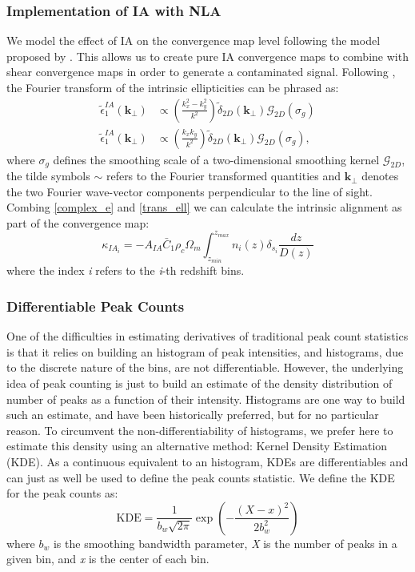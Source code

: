 \documentclass[twocolumn,twocolappendix]{aastex63}
\begin{document}
\subsubsection{Implementation of IA with NLA }
We model the effect of IA on the convergence map level following the model proposed by  \citet{fluri2019cosmological}. This allows us to create pure IA convergence maps to combine with shear convergence maps in order to generate a contaminated signal. 
Following \cite{harnois2021cosmic}, the Fourier transform of the intrinsic ellipticities can be phrased as: 
\begin{align}\label{trans_ell}
    \tilde{ \epsilon}_{1}^{IA}(\textbf{k}_{\bot}) & \propto
    \left ( \frac{k_x^2-k_y^2}{k^2} \right )  \tilde{\delta}_{2D}(\textbf{k}_{\bot})
   \mathcal{G}_{2D}(\sigma_g) \\
       \tilde{ \epsilon}_{1}^{IA}(\textbf{k}_{\bot}) & \propto
    \left ( \frac{k_x k_y}{k^2} \right )  \tilde{\delta}_{2D}(\textbf{k}_{\bot})
   \mathcal{G}_{2D}(\sigma_g), \nonumber
\end{align}
where $\sigma_g$ defines the smoothing scale of a two-dimensional smoothing kernel $\mathcal{G}_{2D}$, the tilde symbols $\sim $ refers to the Fourier transformed quantities and $\textbf{k}_{\bot}$ denotes the two Fourier wave-vector components perpendicular to the line of sight.
Combing \autoref{complex_e} and \autoref{trans_ell} we can calculate the intrinsic alignment as part of the convergence map:
\begin{equation}\label{IA_maps}
    \kappa_{IA_{i}}= 
    - A_{IA}\bar{C}_1\rho_c \Omega_m
    \int_{z_{min}}^{z_{max}} 
    n_{i}(z) \delta_{s_{i}}
    \frac{ dz}{D(z)}
\end{equation}
where the index \textit{i} refers to the \textit{i}-th redshift bins.

\subsubsection{Differentiable Peak Counts}
One of the difficulties in estimating derivatives of traditional peak count statistics is that it relies on building
an histogram of peak intensities, and histograms, due to the discrete nature of the bins, are not differentiable. However, the underlying idea of peak counting is just to build an estimate of the density distribution of number of peaks as a function of their intensity. Histograms are one way to build such an estimate, and have been historically preferred, but for no particular reason. To circumvent the non-differentiability of histograms, we prefer here to estimate this density using an alternative method: Kernel Density Estimation (KDE). As a continuous equivalent to an histogram, KDEs are differentiables and can just as well be used to define the peak counts statistic.  
We define the KDE for the peak counts as:
\begin{equation}
   \text{KDE}= \frac{1}{ b_w \sqrt{2\pi}} \exp{\left ( -\frac{(X-x)^2}{2 b_w^2} \right )}
\end{equation}
where $b_w$ is the smoothing bandwidth parameter, \textit{X} is the number of peaks in a given bin, and \textit{x} is the center of each bin.
\end{document}
